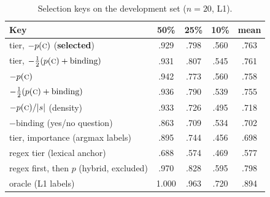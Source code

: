 \documentclass[11pt,a4paper]{article}
\begin{document}
\begin{table}[H]\centering\small
\caption{Selection keys on the development set ($n=20$, L1).}\label{tab:dev}
\begin{tabular}{@{}lcccc@{}}\toprule
Key & 50\% & 25\% & 10\% & mean\\\midrule
tier, $-p(\textsc{c})$ (\textbf{selected}) & .929 & .798 & .560 & .763\\
tier, $-\tfrac12(p(\textsc{c})+\text{binding})$ & .931 & .807 & .545 & .761\\
$-p(\textsc{c})$ & .942 & .773 & .560 & .758\\
$-\tfrac12(p(\textsc{c})+\text{binding})$ & .936 & .790 & .539 & .755\\
$-p(\textsc{c})/|s|$ (density) & .933 & .726 & .495 & .718\\
$-\text{binding}$ (yes/no question) & .863 & .709 & .534 & .702\\
tier, importance (argmax labels) & .895 & .744 & .456 & .698\\
regex tier (lexical anchor) & .688 & .574 & .469 & .577\\
regex first, then $p$ (hybrid, excluded) & .970 & .828 & .595 & .798\\\midrule
oracle (L1 labels) & 1.000 & .963 & .720 & .894\\\bottomrule
\end{tabular}
\end{table}
\end{document}
